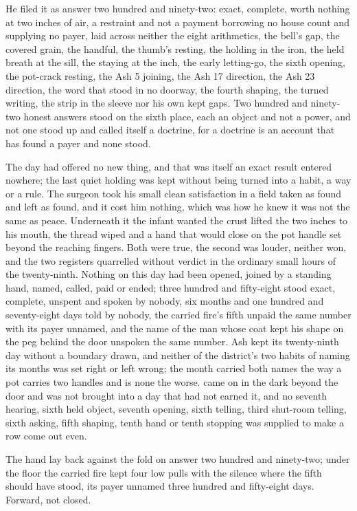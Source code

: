 He filed it as answer two hundred and ninety-two: exact, complete, worth nothing at two inches of air, a restraint and not a payment borrowing no house count and supplying no payer, laid across neither the eight arithmetics, the bell's gap, the covered grain, the handful, the thumb's resting, the holding in the iron, the held breath at the sill, the staying at the inch, the early letting-go, the sixth opening, the pot-crack resting, the Ash 5 joining, the Ash 17 direction, the Ash 23 direction, the word that stood in no doorway, the fourth shaping, the turned writing, the strip in the sleeve nor his own kept gaps. Two hundred and ninety-two honest answers stood on the sixth place, each an object and not a power, and not one stood up and called itself a doctrine, for a doctrine is an account that has found a payer and none stood.

The day had offered no new thing, and that was itself an exact result entered nowhere; the last quiet holding was kept without being turned into a habit, a way or a rule. The surgeon took his small clean satisfaction in a field taken as found and left as found, and it cost him nothing, which was how he knew it was not the same as peace. Underneath it the infant wanted the crust lifted the two inches to his mouth, the thread wiped and a hand that would close on the pot handle set beyond the reaching fingers. Both were true, the second was louder, neither won, and the two registers quarrelled without verdict in the ordinary small hours of the twenty-ninth. Nothing on this day had been opened, joined by a standing hand, named, called, paid or ended; three hundred and fifty-eight stood exact, complete, unspent and spoken by nobody, six months and one hundred and seventy-eight days told by nobody, the carried fire's fifth unpaid the same number with its payer unnamed, and the name of the man whose coat kept his shape on the peg behind the door unspoken the same number. Ash kept its twenty-ninth day without a boundary drawn, and neither of the district's two habits of naming its months was set right or left wrong; the month carried both names the way a pot carries two handles and is none the worse.  came on in the dark beyond the door and was not brought into a day that had not earned it, and no seventh hearing, sixth held object, seventh opening, sixth telling, third shut-room telling, sixth asking, fifth shaping, tenth hand or tenth stopping was supplied to make a row come out even.

The hand lay back against the fold on answer two hundred and ninety-two; under the floor the carried fire kept four low pulls with the silence where the fifth should have stood, its payer unnamed three hundred and fifty-eight days. Forward, not closed.
